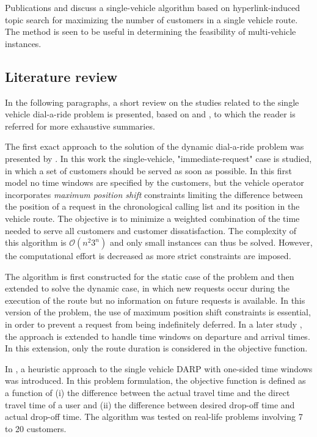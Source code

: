 \documentclass[dissertation,draft*]{aaltoseries}
\begin{document}
Publications  and  discuss a single-vehicle algorithm based on hyperlink-induced topic search \cite{kleinberg} 
for maximizing the number of customers in a single vehicle route. The method is seen to
be useful in determining the feasibility of multi-vehicle instances. 

\subsection{Literature review}
In the following paragraphs, a short review on the studies related to the single vehicle dial-a-ride problem is
presented, based on \cite{cordeau03, cordeau05, cordeau07} and \cite{berbeglia}, to which the reader is referred 
for more exhaustive summaries. 

The first exact approach to the solution 
of the dynamic dial-a-ride problem was presented by \cite{psaraftis01}. 
In this work the single-vehicle, "immediate-request" case is studied, in which a set of customers should be served as soon
as possible. In this first model no time windows are specified by the customers, but the
vehicle operator incorporates \emph{maximum position shift} constraints limiting the difference between
the position of a request in the chronological calling list and its position in the vehicle route. 
The objective is to minimize a weighted combination of the time needed to serve all customers 
and customer dissatisfaction.
The complexity of this algorithm is $\mathcal{O} (n^2 3^n)$ and only small instances
can thus be solved. However, the computational effort is decreased as more strict constraints
are imposed. 

The algorithm is first constructed for the static case of the problem and then 
extended to solve the dynamic case, in which 
new requests occur during the execution of the route but no information on future requests is available.
In this version of the problem, the use of maximum position shift constraints is essential, in order 
to prevent a request from being indefinitely deferred. 
In a later study \cite{psaraftis02},
the approach is extended to handle time windows on departure and arrival times.
In this extension, only the route duration is considered in the objective
function. 

In \cite{sexton02, sexton03}, a heuristic approach to the single vehicle DARP
with one-sided time windows was introduced. 
In this problem formulation, the objective function is defined as a function of (i) the difference between the actual
travel time and the direct travel time of a user and (ii) the difference
between desired drop-off time and actual drop-off time. The algorithm was
tested on real-life problems involving 7 to 20 customers. %
\end{document}

